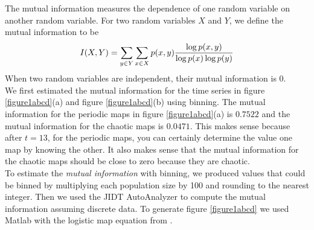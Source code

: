 \documentclass[conference]{IEEEtran}
\begin{document}

\noindent The mutual information measures the dependence of one random variable on another random variable.   For two random variables $X$ and $Y$, we define the mutual information to be
\begin{eqnarray}
I(X,Y) = \sum_{y \in Y} \sum_ {x \in X} p(x,y) { \log p(x,y) \over {\log p(x)  \log p(y)} }
\end{eqnarray}
When two random variables are independent, their mutual information is $0$. \\

\noindent We first estimated the mutual information for the time series in figure \ref{figure1abcd}(a) and figure \ref{figure1abcd}(b) using binning.  
The mutual information for the periodic maps in figure \ref{figure1abcd}(a)  is $0.7522$ and the mutual information for the chaotic maps is $0.0471$.   This makes sense because after $t=13$, for the periodic maps, you can certainly determine the value one map by knowing the other.  It also makes sense that the mutual information for the chaotic maps should be close to zero because they are chaotic.  \\

\noindent To estimate the {\it mutual information} with binning, we produced values that could be binned by multiplying each population size by 100 and rounding to the nearest integer.  Then we used the JIDT AutoAnalyzer \cite{JIDT} to compute the mutual information assuming discrete data.  To generate figure \ref{figure1abcd} we used Matlab with the logistic map equation from \cite{Mitchell}.  
\end{document}
